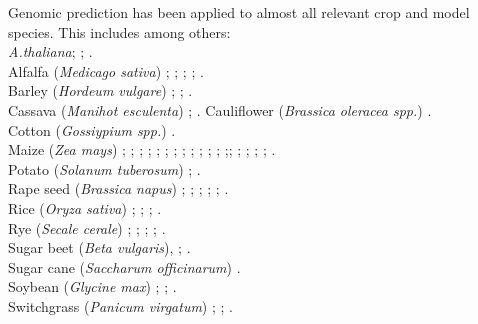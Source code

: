 Genomic prediction has been applied to almost all relevant crop and model species. This
includes among others: \\
\textit{A.thaliana}; \cite{shen2013novel}; \cite{hu2015}.\\
Alfalfa (\textit{Medicago sativa}) \cite{li2012applied}; \cite{annicchiarico2015accuracy}; \cite{li2015genomical}; \cite{biazzi2017genome}; \cite{hawkins2018recent}. \\
Barley (\textit{Hordeum vulgare}) \cite{zhong2009factors}; \cite{oakey2016}; \cite{neyhart2019}. \\
Cassava (\textit{Manihot esculenta}) \cite{elias2018}; \cite{elias2018improving}.
Cauliflower (\textit{Brassica oleracea spp.}) \cite{thorwarth2018genomic}.\\
Cotton (\textit{Gossiypium spp.}) \cite{gapare2018}.\\
Maize (\textit{Zea mays}) \cite{rincent2012}; \cite{windhausen2012};
\cite{technow2013genomic}; \cite{riedelsheimer2013genomic}; \cite{guo2013accuracy};
\cite{peiffer2014genetic}; \cite{technow2014genome}; \cite{lehermeier2014usefulness};
\cite{owens2014foundation}; \cite{montesinos2015threshold}; \cite{bustos2016improvement};
\cite{kadam2016genomic}; \cite{schopp2017accuracy};\cite{schopp2017genomic};
\cite{e2017genomic}; \cite{brauner2018genomic};
\cite{schrag2018beyond}; \cite{moeinizade2019}; \cite{allier2019usefulness}. \\
Potato (\textit{Solanum tuberosum}) \cite{enciso2018genomic}; \cite{Endelman2018pot}.\\
Rape seed (\textit{Brassica napus}) \cite{snowdon2012potential}; \cite{wurschum2014potential}; \cite{qian2014sub}; \cite{jan2016genomic}; \cite{luo2017genomic}; \cite{werner2018effective}.\\
Rice (\textit{Oryza sativa})  \cite{Xu2013rice}; \cite{Grenier2015}; \cite{BenHassen2018}; \cite{Momen2019}. \\
Rye (\textit{Secale cerale}) \cite{bernal2014importance}; \cite{wang2014accuracy};
\cite{auinger2016model}; \cite{marulanda2016optimum}; \cite{bernal2017genomic}.\\
Sugar beet (\textit{Beta vulgaris}), \cite{wurschum2013genomic}; \cite{biscarini2014genome}.\\
Sugar cane (\textit{Saccharum officinarum}) \cite{gouy2013experimental}.\\
Soybean (\textit{Glycine max}) \cite{Jarquin_2016}; \cite{Xavier_2016}; \cite{Stewart_Brown_2019}.\\
Switchgrass (\textit{Panicum virgatum}) \cite{Ramstein_2016}; \cite{Poudel_2019}; \cite{Ramstein_2019}. \\
